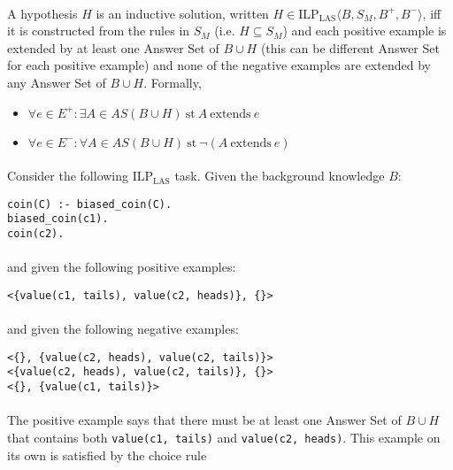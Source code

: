 \documentclass{article}
\theoremstyle{plain}
\theoremstyle{definition}
\begin{document}
\begin{multicols}{2}
\paragraph{} A hypothesis $H$ is an inductive solution, written $H \in \text{ILP}_\text{LAS}\langle B, S_M, B^+, B^- \rangle$, iff it is constructed from the rules in $S_M$ (i.e. $H \subseteq S_M$) and each positive example is extended by at least one Answer Set of $B \cup H$ (this can be different Answer Set for each positive example) and none of the negative examples are extended by any Answer Set of $B \cup H$. Formally,

\begin{itemize}
\item $\forall e \in E^+: \exists A \in AS(B \cup H)\ \text{st}\ A\ \text{extends}\ e$
\item $\forall e \in E^-: \forall A \in AS(B \cup H)\ \text{st}\ \lnot(A\ \text{extends}\ e)$
\end{itemize}

\paragraph{} Consider the following $\text{ILP}_\text{LAS}$ task. Given the background knowledge $B$:

\begin{lstlisting}
coin(C) :- biased_coin(C).
biased_coin(c1).
coin(c2).
\end{lstlisting}

\paragraph{} and given the following positive examples:

\begin{lstlisting}
<{value(c1, tails), value(c2, heads)}, {}>
\end{lstlisting}

\paragraph{} and given the following negative examples:

\begin{lstlisting}
<{}, {value(c2, heads), value(c2, tails)}>
<{value(c2, heads), value(c2, tails)}, {}>
<{}, {value(c1, tails)}>
\end{lstlisting}

\paragraph{} The positive example says that there must be at least one Answer Set of $B \cup H$ that contains both \lstinline{value(c1, tails)} and \lstinline{value(c2, heads)}. This example on its own is satisfied by the choice rule 


\end{multicols}
\end{document}
